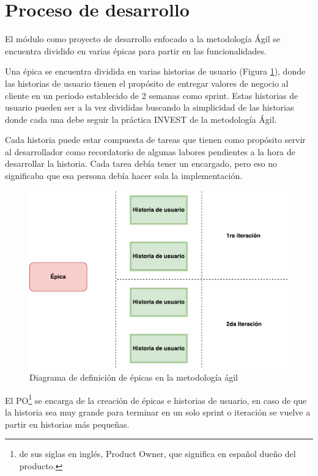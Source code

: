 \section{Proceso de desarrollo}
El módulo como proyecto de desarrollo enfocado a la metodología Ágil se encuentra dividido en varias épicas para partir en las funcionalidades.

Una épica se encuentra dividida en varias historias de usuario (Figura \ref{epic}), donde las historias de usuario tienen el propósito de entregar valores de negocio al cliente en un periodo establecido de 2 semanas como sprint. Estas historias de usuario pueden ser a la vez divididas buscando la simplicidad de las historias donde cada una debe seguir la práctica INVEST de la metodología Ágil.

Cada historia puede estar compuesta de tareas que tienen como propósito servir al desarrollador como recordatorio de algunas labores pendientes a la hora de desarrollar la historia. Cada tarea debía tener un encargado, pero eso no significaba que esa persona debía hacer sola la implementación.

\begin{figure}[H]
\centering
\includegraphics[width=125mm,scale=1]{Capitulos/PropuestadeSolucion/Imagenes/epic_diagram}
\caption{Diagrama de definición de épicas en la metodología ágil}
  \label{epic}
\end{figure}

El PO\footnote{de sus siglas en inglés, Product Owner, que significa en español dueño del producto.} se encarga de la creación de épicas e historias de usuario, en caso de que la historia sea muy grande para terminar en un solo sprint o iteración se vuelve a partir en historias más pequeñas. 

